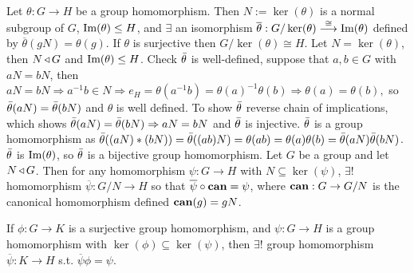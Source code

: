  Let $\theta : G \to H$ be a group homomorphism. Then $N := \ker(\theta)$ is a normal subgroup of $G$, $\text{Im}(\theta) \le H$, and $\exists$ an isomorphism $\overline{\theta} : G/\ker(\theta) \stackrel{\cong}{\longrightarrow} \text{Im}(\theta)$ defined by $\overline{\theta}(gN) = \theta(g)$. If $\theta$ is surjective then $G/\ker(\theta) \cong H$.
\wpf{} Let $N = \ker(\theta)$, then $N \operatorname{\triangleleft} G$ and $\text{Im}(\theta) \le H$. Check $\Bar{\theta}$ is well-defined, suppose that $a,b \in  G$ with $aN = bN$, then $aN = bN \Rightarrow a^{-1}b \in N \Rightarrow e_H = \theta(a^{-1}b) = \theta(a)^{-1}\theta(b) \Rightarrow \theta(a) = \theta(b),$ so $\Bar{\theta}(aN) = \Bar{\theta}(bN)$ and $\theta$ is well defined. To show $\Bar{\theta}$ reverse chain of implications, which shows $\Bar{\theta}(aN) = \Bar{\theta}(bN) \Rightarrow aN = bN$ and $\Bar{\theta} $ is injective. $\Bar{\theta}$ is a group homomorphism as $\Bar{\theta}((aN) * (bN)) = \Bar{\theta}((ab)N) = \theta(ab) = \theta(a)\theta(b) = \Bar{\theta}(aN)\Bar{\theta}(bN)$. $\Bar{\theta}$ is $\text{Im}{(\theta)}$, so $\Bar{\theta}$  is a bijective group homomorphism. 
 Let $G$ be a group and let $N \operatorname{\triangleleft} G$. Then for any homomorphism $\psi : G \to H$ with $N \subseteq \ker(\psi)$, $\exists!$ homomorphism $\overline{\psi}: G/N \to H$ so that $\overline{\psi} \circ \text{\textbf{can}} = \psi$, where $\text{\textbf{can}} : G \to G/N$ is the canonical homomorphism defined $\text{\textbf{can}}(g) = gN$.
 If $\phi : G \to K$ is a surjective group homomorphism, and $\psi : G \to H$ is a group homomorphism with $\ker(\phi) \subseteq \ker(\psi)$, then $\exists!$ group homomorphism $\overline{\psi}: K \to H$ s.t. $\overline{\psi} \phi = \psi$.
